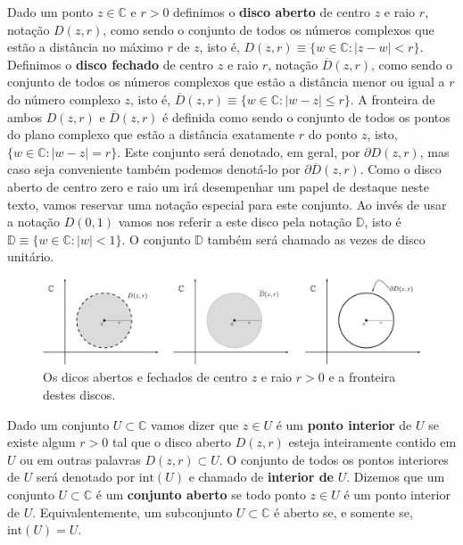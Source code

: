 Dado um ponto $z\in\mathbb{C}$ e $r>0$ definimos o {\bf disco aberto} de centro 
$z$ e raio $r$, notação $D(z,r)$,
como sendo o conjunto de todos os números complexos que estão a distância no máximo $r$ de $z$,
isto é, $D(z,r) \equiv \{w\in\mathbb{C}: |z-w|<r \}$.
Definimos o {\bf disco fechado} de centro $z$ e raio $r$, notação $\overline{D}(z,r)$, 
como sendo o conjunto de todos os números complexos que estão a distância menor ou igual a $r$ 
do número complexo $z$, isto é, $\overline{D}(z,r)\equiv \{w\in\mathbb{C}: |w-z|\leqslant r\}$.
A fronteira de ambos $D(z,r)$ e $\overline{D}(z,r)$ é definida como sendo o conjunto 
de todos os pontos do plano complexo que estão a distância exatamente $r$ do ponto $z$,
isto, $\{w\in \mathbb{C}: |w-z|=r\}$. Este conjunto será denotado, em geral, por $\partial D(z,r)$, 
mas caso seja conveniente também podemos denotá-lo por $\partial \overline{D}(z,r)$. 
Como o disco aberto de centro zero e raio um irá desempenhar um papel de destaque neste texto,
vamos reservar uma notação especial para este conjunto. Ao invés de usar a notação $D(0,1)$
vamos nos referir a este disco pela notação $\mathbb{D}$, isto é $\mathbb{D}\equiv \{w\in \mathbb{C}: |w|<1\}$.
O conjunto $\mathbb{D}$ também será chamado as vezes de disco unitário.


\begin{figure}[h]
\centering
\includegraphics[width=1\linewidth]{Figuras/discos-fronteira}
\caption{Os dicos abertos e fechados de centro $z$ e raio $r>0$ e a fronteira destes discos.}
\label{fig:discos-fronteira}
\end{figure}


\medskip 

Dado um conjunto $U\subset \mathbb{C}$ vamos dizer que $z\in U$ é um {\bf ponto interior} de $U$
se existe algum $r>0$ tal que o disco aberto $D(z,r)$ esteja inteiramente contido em $U$ ou 
em outras palavras $D(z,r)\subset U$. 
O conjunto de todos os pontos interiores de $U$
será denotado por $\mathrm{int}(U)$ e chamado de \textbf{interior de} $U$.
Dizemos que um conjunto $U\subset \mathbb{C}$ é um {\bf conjunto aberto} se todo ponto $z\in U$ é 
um ponto interior de $U$. 
Equivalentemente, um subconjunto $U\subset\mathbb{C}$ é aberto se, e somente se, 
$\mathrm{int}(U)=U$.

